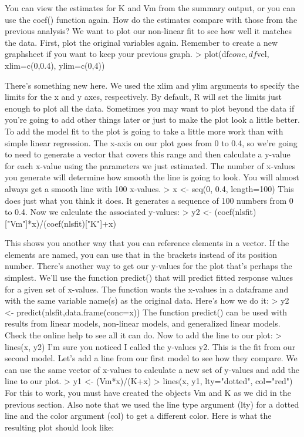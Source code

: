 You can view the estimates for K and Vm from the summary output, or you can use the coef() function again. How do the estimates compare with those from the previous analysis? We want to plot our non-linear fit to see how well it matches the data. First, plot the original variables again. Remember to create a new graphsheet if you want to keep your previous graph. 
> plot(df$conc, df$vel, xlim=c(0,0.4), ylim=c(0,4))


There's something new here. We used the xlim and ylim arguments to specify the limits for the x and y axes, respectively. By default, R will set the limits just enough to plot all the data. Sometimes you may want to plot beyond the data if you're going to add other things later or just to make the plot look a little better. 
To add the model fit to the plot is going to take a little more work than with simple linear regression. The x-axis on our plot goes from 0 to 0.4, so we're going to need to generate a vector that covers this range and then calculate a y-value for each x-value using the parameters we just estimated. The number of x-values you generate will determine how smooth the line is going to look. You will almost always get a smooth line with 100 x-values. 
> x <- seq(0, 0.4, length=100)
This does just what you think it does. It generates a sequence of 100 numbers from 0 to 0.4. Now we calculate the associated y-values: 
> y2 <- (coef(nlsfit)["Vm"]*x)/(coef(nlsfit)["K"]+x)


This shows you another way that you can reference elements in a vector. If the elements are named, you can use that in the brackets instead of its position number. There's another way to get our y-values for the plot that's perhaps the simplest. We'll use the function predict() that will predict fitted response values for a given set of x-values. The function wants the x-values in a dataframe and with the same variable name(s) as the original data. Here's how we do it: 
> y2 <- predict(nlsfit,data.frame(conc=x))
The function predict() can be used with results from linear models, non-linear models, and generalized linear models. Check the online help to see all it can do. Now to add the line to our plot: 
> lines(x, y2)
I'm sure you noticed I called the y-values y2. This is the fit from our second model. Let's add a line from our first model to see how they compare. We can use the same vector of x-values to calculate a new set of y-values and add the line to our plot. 
> y1 <- (Vm*x)/(K+x)
> lines(x, y1, lty="dotted", col="red")
For this to work, you must have created the objects Vm and K as we did in the previous section. Also note that we used the line type argument (lty) for a dotted line and the color argument (col) to get a different color. Here is what the resulting plot should look like: 



